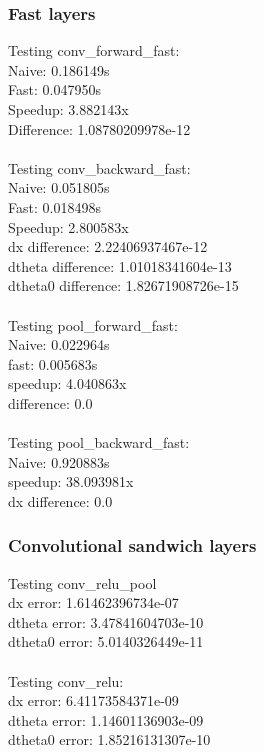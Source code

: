 \documentclass{article}
\begin{document}
\subsubsection*{Fast layers}
{\footnotesize
Testing conv\_forward\_fast:\\
Naive: 0.186149s\\
Fast: 0.047950s\\
Speedup: 3.882143x\\
Difference:  1.08780209978e-12\\
\\
Testing conv\_backward\_fast:\\
Naive: 0.051805s\\
Fast: 0.018498s\\
Speedup: 2.800583x\\
dx difference:  2.22406937467e-12\\
dtheta difference:  1.01018341604e-13\\
dtheta0 difference:  1.82671908726e-15\\
\\
Testing pool\_forward\_fast:\\
Naive: 0.022964s\\
fast: 0.005683s\\
speedup: 4.040863x\\
difference:  0.0\\
\\
Testing pool\_backward\_fast:\\
Naive: 0.920883s\\
speedup: 38.093981x\\
dx difference:  0.0\\
}

\subsubsection*{Convolutional sandwich layers}
{\footnotesize
Testing conv\_relu\_pool\\
dx error:  1.61462396734e-07\\
dtheta error:  3.47841604703e-10\\
dtheta0 error:  5.0140326449e-11\\
\\
Testing conv\_relu:\\
dx error:  6.41173584371e-09\\
dtheta error:  1.14601136903e-09\\
dtheta0 error:  1.85216131307e-10\\
}
\end{document}
